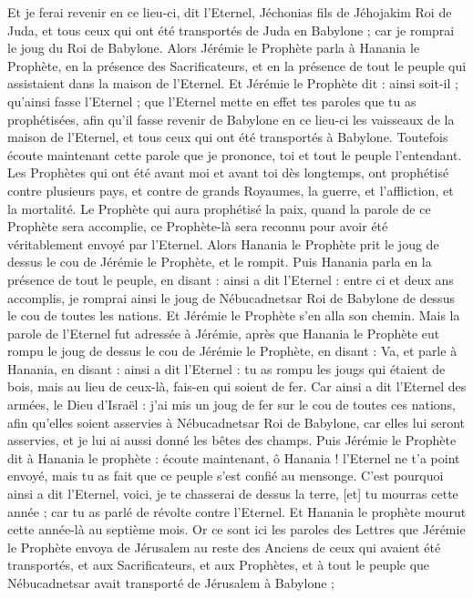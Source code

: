 \begin{multicols}{2}
Et je ferai revenir en ce lieu-ci, dit l'Eternel, Jéchonias fils de Jéhojakim Roi de Juda, et tous ceux qui ont été transportés de Juda en Babylone ; car je romprai le joug du Roi de Babylone.
Alors Jérémie le Prophète parla à Hanania le Prophète, en la présence des Sacrificateurs, et en la présence de tout le peuple qui assistaient dans la maison de l'Eternel.
Et Jérémie le Prophète dit : ainsi soit-il ; qu'ainsi fasse l'Eternel ; que l'Eternel mette en effet tes paroles que tu as prophétisées, afin qu'il fasse revenir de Babylone en ce lieu-ci les vaisseaux de la maison de l'Eternel, et tous ceux qui ont été transportés à Babylone.
Toutefois écoute maintenant cette parole que je prononce, toi et tout le peuple l'entendant.
Les Prophètes qui ont été avant moi et avant toi dès longtemps, ont prophétisé contre plusieurs pays, et contre de grands Royaumes, la guerre, et l'affliction, et la mortalité.
Le Prophète qui aura prophétisé la paix, quand la parole de ce Prophète sera accomplie, ce Prophète-là sera reconnu pour avoir été véritablement envoyé par l'Eternel.
Alors Hanania le Prophète prit le joug de dessus le cou de Jérémie le Prophète, et le rompit.
Puis Hanania parla en la présence de tout le peuple, en disant : ainsi a dit l'Eternel : entre ci et deux ans accomplis, je romprai ainsi le joug de Nébucadnetsar Roi de Babylone de dessus le cou de toutes les nations. Et Jérémie le Prophète s'en alla son chemin.
Mais la parole de l'Eternel fut adressée à Jérémie, après que Hanania le Prophète eut rompu le joug de dessus le cou de Jérémie le Prophète, en disant :
Va, et parle à Hanania, en disant : ainsi a dit l'Eternel : tu as rompu les jougs qui étaient de bois, mais au lieu de ceux-là, fais-en qui soient de fer.
Car ainsi a dit l'Eternel des armées, le Dieu d'Israël : j'ai mis un joug de fer sur le cou de toutes ces nations, afin qu'elles soient asservies à Nébucadnetsar Roi de Babylone, car elles lui seront asservies, et je lui ai aussi donné les bêtes des champs.
Puis Jérémie le Prophète dit à Hanania le prophète : écoute maintenant, ô Hanania ! l'Eternel ne t'a point envoyé, mais tu as fait que ce peuple s'est confié au mensonge.
C'est pourquoi ainsi a dit l'Eternel, voici, je te chasserai de dessus la terre, [et] tu mourras cette année ; car tu as parlé de révolte contre l'Eternel.
Et Hanania le prophète mourut cette année-là au septième mois.
\VerseOne{}Or ce sont ici les paroles des Lettres que Jérémie le Prophète envoya de Jérusalem au reste des Anciens de ceux qui avaient été transportés, et aux Sacrificateurs, et aux Prophètes, et à tout le peuple que Nébucadnetsar avait transporté de Jérusalem à Babylone ;

\end{multicols}
